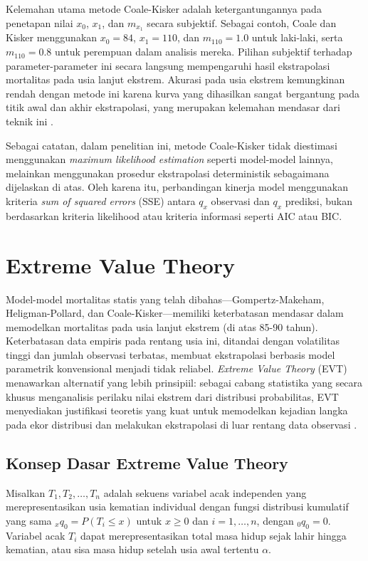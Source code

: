 Kelemahan utama metode Coale-Kisker adalah ketergantungannya pada penetapan nilai $x_0$, $x_1$, dan $m_{x_1}$ secara subjektif. Sebagai contoh, Coale dan Kisker menggunakan $x_0 = 84$, $x_1 = 110$, dan $m_{110} = 1.0$ untuk laki-laki, serta $m_{110} = 0.8$ untuk perempuan dalam analisis mereka. Pilihan subjektif terhadap parameter-parameter ini secara langsung mempengaruhi hasil ekstrapolasi mortalitas pada usia lanjut ekstrem. Akurasi pada usia ekstrem kemungkinan rendah dengan metode ini karena kurva yang dihasilkan sangat bergantung pada titik awal dan akhir ekstrapolasi, yang merupakan kelemahan mendasar dari teknik ini \citep{huang2020modelling}.

Sebagai catatan, dalam penelitian ini, metode Coale-Kisker tidak diestimasi menggunakan \textit{maximum likelihood estimation} seperti model-model lainnya, melainkan menggunakan prosedur ekstrapolasi deterministik sebagaimana dijelaskan di atas. Oleh karena itu, perbandingan kinerja model menggunakan kriteria \textit{sum of squared errors} (SSE) antara $q_x$ observasi dan $q_x$ prediksi, bukan berdasarkan kriteria likelihood atau kriteria informasi seperti AIC atau BIC.

\section{Extreme Value Theory}

Model-model mortalitas statis yang telah dibahas—Gompertz-Makeham, Heligman-Pollard, dan Coale-Kisker—memiliki keterbatasan mendasar dalam memodelkan mortalitas pada usia lanjut ekstrem (di atas 85-90 tahun). Keterbatasan data empiris pada rentang usia ini, ditandai dengan volatilitas tinggi dan jumlah observasi terbatas, membuat ekstrapolasi berbasis model parametrik konvensional menjadi tidak reliabel. \textit{Extreme Value Theory} (EVT) menawarkan alternatif yang lebih prinsipiil: sebagai cabang statistika yang secara khusus menganalisis perilaku nilai ekstrem dari distribusi probabilitas, EVT menyediakan justifikasi teoretis yang kuat untuk memodelkan kejadian langka pada ekor distribusi dan melakukan ekstrapolasi di luar rentang data observasi \citep{coles2001introduction, embrechts1997modelling, gbari2017extreme}.

\subsection{Konsep Dasar Extreme Value Theory}

Misalkan $T_1, T_2, \ldots, T_n$ adalah sekuens variabel acak independen yang merepresentasikan usia kematian individual dengan fungsi distribusi kumulatif yang sama $_xq_0 = P(T_i \leq x)$ untuk $x \geq 0$ dan $i = 1, \ldots, n$, dengan $_0q_0 = 0$. Variabel acak $T_i$ dapat merepresentasikan total masa hidup sejak lahir hingga kematian, atau sisa masa hidup setelah usia awal tertentu $\alpha$.

